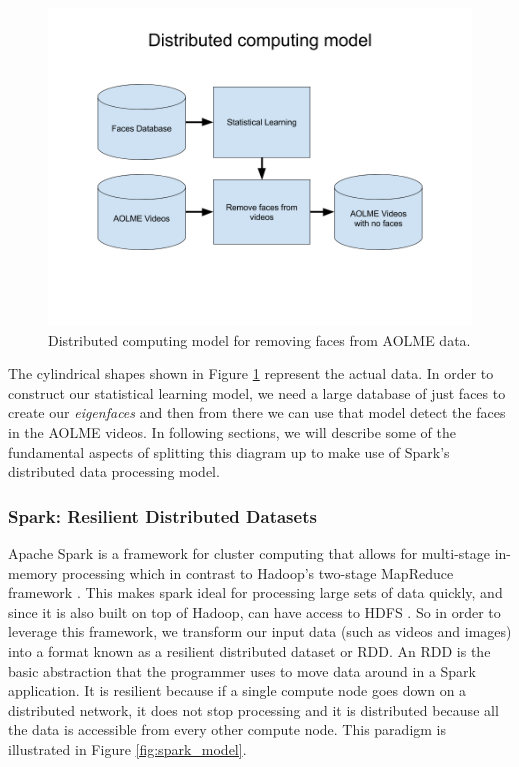 \documentclass[
	submission,
	final,
	notitlepage,
	narroweqnarray,
	inline,
	twoside,
	]{ieee}
\begin{document}
\begin{figure}[h]
\centering
\includegraphics[width=\linewidth]{figures/face_detection_block_diagram}
\caption{Distributed computing model for removing faces from AOLME data.}
\label{fig:distributed_computing_model} 
\end{figure}

\FloatBarrier

The cylindrical shapes shown in Figure \ref{fig:distributed_computing_model}
represent the actual data. In order to construct our statistical learning model,
we need a large database of just faces to create our \textit{eigenfaces}
and then from there we can use that model detect the faces in the AOLME
videos. In following sections, we will describe some of the 
fundamental aspects of splitting this diagram up to make use of Spark's
distributed data processing model. 

\subsubsection{Spark: Resilient Distributed Datasets}
Apache Spark is a framework for cluster computing that allows for multi-stage
in-memory processing which in contrast to Hadoop's two-stage MapReduce
framework \cite{spark} \cite{hadoop}. This makes spark ideal for
processing large sets of data quickly, and since it is also built 
on top of Hadoop, can have access to HDFS \cite{spark}. So in order
to leverage this framework, we transform our input data (such as videos
and images) into a format known as a resilient distributed dataset 
or RDD. An RDD is the basic abstraction that the programmer uses
to move data around in a Spark application. It is resilient because
if a single compute node goes down on a distributed network, it does
not stop processing and it is distributed because all the data is 
accessible from every other compute node. This paradigm is illustrated
in Figure \ref{fig:spark_model}.
\end{document}
